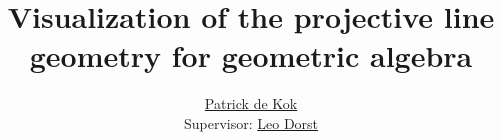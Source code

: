 \documentclass[a4paper,11pt,twoside]{article}
\title{Visualization of the projective line geometry for geometric algebra} %
\author{\href{mailto:pkok@science.uva.nl}{Patrick de Kok}\\ Supervisor: \href{mailto:L.Dorst@uva.nl}{Leo Dorst}}
\begin{document}
\begin{titlepage}
  
\end{titlepage}
\begin{abstract}

\end{abstract}
\tableofcontents







\appendix

\clearpage

{}

\end{document}
